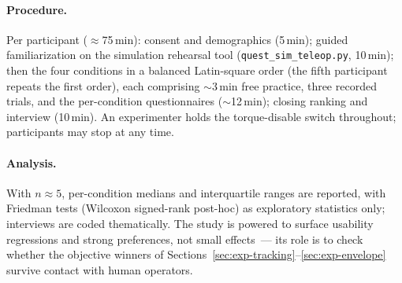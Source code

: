 \paragraph{Procedure.}
Per participant (\(\approx\)75\,min): consent and demographics
(5\,min); guided familiarization on the simulation rehearsal tool
(\texttt{quest\_sim\_teleop.py}, 10\,min); then the four conditions in a
balanced Latin-square order (the fifth participant repeats the first
order), each comprising \(\sim\)3\,min free practice, three recorded
trials, and the per-condition questionnaires (\(\sim\)12\,min); closing
ranking and interview (10\,min). An experimenter holds the
torque-disable switch throughout; participants may stop at any time.

\paragraph{Analysis.}
With \(n\approx5\), per-condition medians and interquartile ranges are
reported, with Friedman tests (Wilcoxon signed-rank post-hoc) as
exploratory statistics only; interviews are coded thematically. The study
is powered to surface usability regressions and strong preferences, not
small effects~--- its role is to check whether the objective winners of
Sections~\ref{sec:exp-tracking}--\ref{sec:exp-envelope} survive contact
with human operators.
